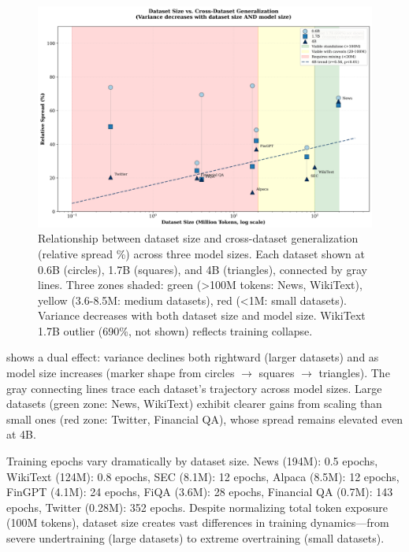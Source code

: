 \begin{figure}[h]
\centering
\includegraphics[width=\textwidth]{figures/scatter_size_variance.png}
\caption[Dataset Size vs. Generalization Across Model Scales]{Relationship between dataset size and cross-dataset generalization (relative spread \%) across three model sizes. Each dataset shown at 0.6B (circles), 1.7B (squares), and 4B (triangles), connected by gray lines. Three zones shaded: green (>100M tokens: News, WikiText), yellow (3.6-8.5M: medium datasets), red (<1M: small datasets). Variance decreases with both dataset size and model size. WikiText 1.7B outlier (690\%, not shown) reflects training collapse.}
\label{fig:scatter_size_variance}
\end{figure}

 shows a dual effect: variance declines both rightward (larger datasets) and as model size increases (marker shape from circles \(\to\) squares \(\to\) triangles). The gray connecting lines trace each dataset's trajectory across model sizes. Large datasets (green zone: News, WikiText) exhibit clearer gains from scaling than small ones (red zone: Twitter, Financial QA), whose spread remains elevated even at 4B.

Training epochs vary dramatically by dataset size. News (194M): 0.5 epochs, WikiText (124M): 0.8 epochs, SEC (8.1M): 12 epochs, Alpaca (8.5M): 12 epochs, FinGPT (4.1M): 24 epochs, FiQA (3.6M): 28 epochs, Financial QA (0.7M): 143 epochs, Twitter (0.28M): 352 epochs. Despite normalizing total token exposure (100M tokens), dataset size creates vast differences in training dynamics—from severe undertraining (large datasets) to extreme overtraining (small datasets).

